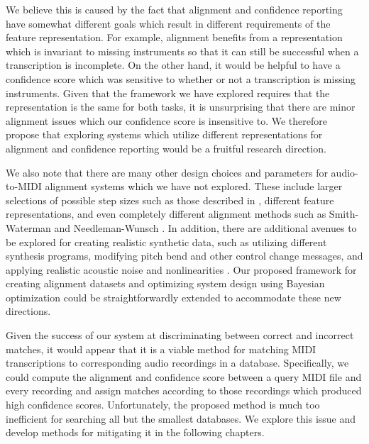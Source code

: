 We believe this is caused by the fact that alignment and confidence reporting have somewhat different goals which result in different requirements of the feature representation.
For example, alignment benefits from a representation which is invariant to missing instruments so that it can still be successful when a transcription is incomplete.
On the other hand, it would be helpful to have a confidence score which was sensitive to whether or not a transcription is missing instruments.
Given that the framework we have explored requires that the representation is the same for both tasks, it is unsurprising that there are minor alignment issues which our confidence score is insensitive to.
We therefore propose that exploring systems which utilize different representations for alignment and confidence reporting would be a fruitful research direction.

We also note that there are many other design choices and parameters for audio-to-MIDI alignment systems which we have not explored.
These include larger selections of possible step sizes such as those described in \cite{muller2007dynamic, sakoe1978dynamic}, different feature representations, and even completely different alignment methods such as Smith-Waterman \cite{ewert2012towards} and Needleman-Wunsch \cite{grachten2013automatic}.
In addition, there are additional avenues to be explored for creating realistic synthetic data, such as utilizing different synthesis programs, modifying pitch bend and other control change messages, and applying realistic acoustic noise and nonlinearities \cite{mcfee2015software}.
Our proposed framework for creating alignment datasets and optimizing system design using Bayesian optimization could be straightforwardly extended to accommodate these new directions.

Given the success of our system at discriminating between correct and incorrect matches, it would appear that it is a viable method for matching MIDI transcriptions to corresponding audio recordings in a database.
Specifically, we could compute the alignment and confidence score between a query MIDI file and every recording and assign matches according to those recordings which produced high confidence scores.
Unfortunately, the proposed method is much too inefficient for searching all but the smallest databases.
We explore this issue and develop methods for mitigating it in the following chapters.
